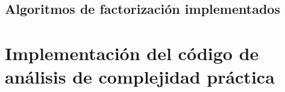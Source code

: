 \documentclass{article}
\begin{document}
\subsection{Algoritmos de factorización implementados} \label{sec:algoritmos}



\pagebreak

\section{Implementación del código de análisis de complejidad práctica} \label{sec:complejidad}



%
\end{document}

